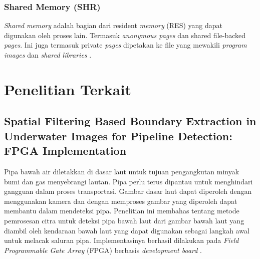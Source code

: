 
\subsubsection{Shared Memory (SHR)}

\textit{Shared} \textit{memory} adalah bagian dari resident \textit{memory} (RES) yang dapat digunakan oleh proses lain. Termasuk \textit{anonymous pages} dan shared file-backed \textit{pages}. Ini juga termasuk private \textit{pages} dipetakan ke file yang mewakili \textit{program images} dan \textit{shared libraries} \cite{manual:linux}. 




\section{Penelitian Terkait}
\subsection{Spatial Filtering Based Boundary Extraction in Underwater Images for Pipeline Detection: FPGA Implementation}
Pipa bawah air diletakkan di dasar laut untuk tujuan pengangkutan minyak bumi dan gas menyebrangi lautan. Pipa perlu terus dipantau untuk menghindari gangguan dalam proses transportasi. Gambar dasar laut dapat diperoleh dengan menggunakan kamera dan dengan memproses gambar yang diperoleh dapat membantu dalam mendeteksi pipa. Penelitian ini membahas tentang metode pemrosesan citra untuk deteksi pipa bawah laut dari gambar bawah laut yang diambil oleh kendaraan bawah laut yang dapat digunakan sebagai langkah awal untuk melacak saluran pipa. Implementasinya berhasil dilakukan pada \textit{Field Programmable Gate Array} (FPGA) berbasis \textit{development board} \cite{soa:alex-raj}.

